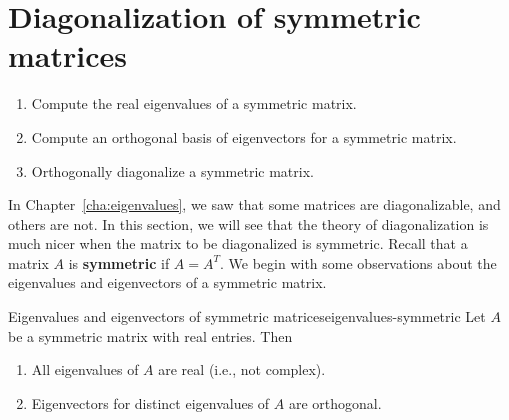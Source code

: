 \section{Diagonalization of symmetric matrices}

\begin{outcome}
  \begin{enumerate}
  \item Compute the real eigenvalues of a symmetric matrix.
  \item Compute an orthogonal basis of eigenvectors for a symmetric
    matrix.
  \item Orthogonally diagonalize a symmetric matrix. 
  \end{enumerate}
\end{outcome}

In Chapter~\ref{cha:eigenvalues}, we saw that some matrices are
diagonalizable, and others are not. In this section, we will see that
the theory of diagonalization is much nicer when the matrix to be
diagonalized is symmetric. Recall that a matrix $A$ is
\textbf{symmetric}%
%
 if $A=A^T$. We begin with some observations
about the eigenvalues and eigenvectors of a symmetric matrix.

\begin{proposition}{Eigenvalues and eigenvectors of symmetric matrices}{eigenvalues-symmetric}
  Let $A$ be a symmetric matrix with real entries. Then
  \begin{enumialphparenastyle}
    \begin{enumerate}
    \item All eigenvalues of $A$ are real (i.e., not complex).
    \item Eigenvectors for distinct eigenvalues of $A$ are orthogonal.
    \end{enumerate}
  \end{enumialphparenastyle}
\end{proposition}

